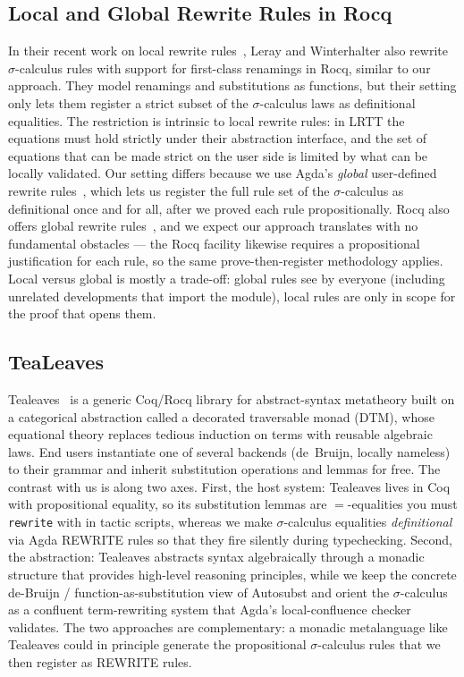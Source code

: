 \documentclass[a4paper,UKenglish,cleveref, autoref, thm-restate,anonymous]{lipics-v2021}
\begin{document}
\subsection*{Local and Global Rewrite Rules in Rocq}
In their recent work on local rewrite rules~\cite{10.1145/3776704}, Leray and
Winterhalter also rewrite $σ$-calculus rules with support for first-class
renamings in Rocq, similar to our approach. They model renamings and
substitutions as functions, but their setting only lets them register a
strict subset of the $σ$-calculus laws as definitional equalities. The
restriction is intrinsic to local rewrite rules: in LRTT the equations must
hold strictly under their abstraction interface, and the set of equations
that can be made strict on the user side is limited by what can be
locally validated. Our setting differs because we use Agda's
\emph{global} user-defined rewrite rules~\cite{cockx:LIPIcs.TYPES.2019.2,
10.1145/3434341}, which lets us register the full rule set of the
$σ$-calculus as definitional once and for all, after we proved each rule
propositionally. Rocq also offers global rewrite
rules~\cite{leray_et_al:LIPIcs.ITP.2024.26}, and we expect our approach
translates with no fundamental obstacles --- the Rocq facility likewise
requires a propositional justification for each rule, so the same
prove-then-register methodology applies. Local versus global is mostly a
trade-off: global rules see by everyone (including unrelated developments
that import the module), local rules are only in scope for the proof that
opens them.

\subsection*{TeaLeaves}
Tealeaves~\cite{tealeaves2023, tealeaves-jar2025} is a generic Coq/Rocq
library for abstract-syntax metatheory built on a categorical abstraction
called a decorated traversable monad (DTM), whose equational theory replaces
tedious induction on terms with reusable algebraic laws. End users instantiate
one of several backends (de~Bruijn, locally nameless) to their grammar and
inherit substitution operations and lemmas for free. The contrast with us is
along two axes. First, the host system: Tealeaves lives in Coq with
propositional equality, so its substitution lemmas are
$=$-equalities you must \texttt{rewrite} with in tactic scripts, whereas we
make $σ$-calculus equalities \emph{definitional} via Agda REWRITE rules so
that they fire silently during typechecking. Second, the abstraction:
Tealeaves abstracts syntax algebraically through a monadic structure
that provides high-level reasoning principles, while we keep the concrete
de-Bruijn / function-as-substitution view of Autosubst and orient the
$σ$-calculus as a confluent term-rewriting system that Agda's local-confluence
checker validates. The two approaches are complementary: a monadic
metalanguage like Tealeaves could in principle generate the propositional
$σ$-calculus rules that we then register as REWRITE rules.
\end{document}
